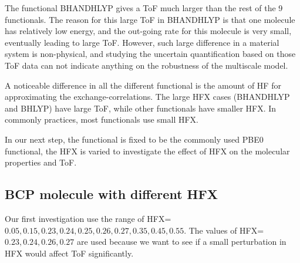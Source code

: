\documentclass[letterpaper,12pt]{article}
\begin{document}
The functional BHANDHLYP gives a ToF much larger than the rest of the 9 functionals. 
The reason for this large ToF in BHANDHLYP is that one molecule has relatively low energy, and the out-going rate for this molecule is very small, eventually leading to large ToF. 
However, such large difference in a material system is non-physical, and studying the uncertain quantification based on those ToF data can not indicate anything on the robustness of the multiscale model. 

A noticeable difference in all the different functional is the amount of HF for approximating the exchange-correlations. 
The large HFX cases (BHANDHLYP and BHLYP) have large ToF, while other functionals have smaller HFX. In commonly practices, most functionals use small HFX. 

In our next step, the functional is fixed to be the commonly used PBE0 functional, the HFX is varied to investigate the effect of HFX on the molecular properties and ToF.

\subsection{BCP molecule with different HFX}
Our first investigation use the range of HFX=$0.05,0.15,0.23,0.24,0.25,0.26,0.27,0.35,0.45,0.55$. The values of HFX=$0.23,0.24,0.26,0.27$ are used because we want to see if a small perturbation in HFX would affect ToF significantly. 
\end{document}
